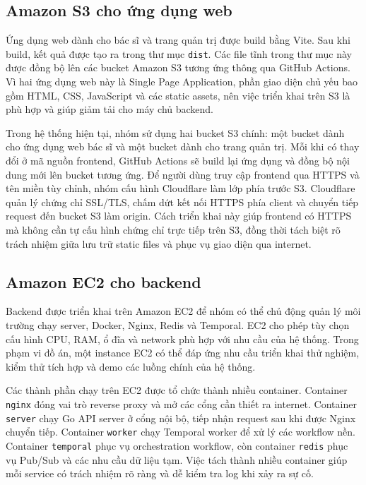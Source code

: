 \subsection{Amazon S3 cho ứng dụng web}
\par Ứng dụng web dành cho bác sĩ và trang quản trị được build bằng Vite. Sau khi build, kết quả được tạo ra trong thư mục \texttt{dist}. Các file tĩnh trong thư mục này được đồng bộ lên các bucket Amazon S3 tương ứng thông qua GitHub Actions. Vì hai ứng dụng web này là Single Page Application, phần giao diện chủ yếu bao gồm HTML, CSS, JavaScript và các static assets, nên việc triển khai trên S3 là phù hợp và giúp giảm tải cho máy chủ backend.

\par Trong hệ thống hiện tại, nhóm sử dụng hai bucket S3 chính: một bucket dành cho ứng dụng web bác sĩ và một bucket dành cho trang quản trị. Mỗi khi có thay đổi ở mã nguồn frontend, GitHub Actions sẽ build lại ứng dụng và đồng bộ nội dung mới lên bucket tương ứng. Để người dùng truy cập frontend qua HTTPS và tên miền tùy chỉnh, nhóm cấu hình Cloudflare làm lớp phía trước S3. Cloudflare quản lý chứng chỉ SSL/TLS, chấm dứt kết nối HTTPS phía client và chuyển tiếp request đến bucket S3 làm origin. Cách triển khai này giúp frontend có HTTPS mà không cần tự cấu hình chứng chỉ trực tiếp trên S3, đồng thời tách biệt rõ trách nhiệm giữa lưu trữ static files và phục vụ giao diện qua internet.

\subsection{Amazon EC2 cho backend}
\par Backend được triển khai trên Amazon EC2 để nhóm có thể chủ động quản lý môi trường chạy server, Docker, Nginx, Redis và Temporal. EC2 cho phép tùy chọn cấu hình CPU, RAM, ổ đĩa và network phù hợp với nhu cầu của hệ thống. Trong phạm vi đồ án, một instance EC2 có thể đáp ứng nhu cầu triển khai thử nghiệm, kiểm thử tích hợp và demo các luồng chính của hệ thống.

\par Các thành phần chạy trên EC2 được tổ chức thành nhiều container. Container \texttt{nginx} đóng vai trò reverse proxy và mở các cổng cần thiết ra internet. Container \texttt{server} chạy Go API server ở cổng nội bộ, tiếp nhận request sau khi được Nginx chuyển tiếp. Container \texttt{worker} chạy Temporal worker để xử lý các workflow nền. Container \texttt{temporal} phục vụ orchestration workflow, còn container \texttt{redis} phục vụ Pub/Sub và các nhu cầu dữ liệu tạm. Việc tách thành nhiều container giúp mỗi service có trách nhiệm rõ ràng và dễ kiểm tra log khi xảy ra sự cố.

